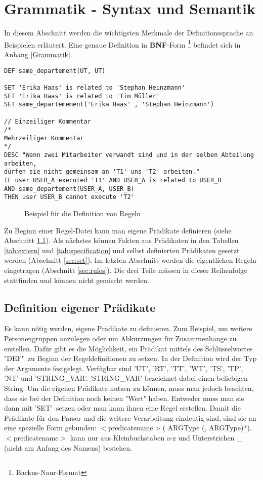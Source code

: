 \section{Grammatik - Syntax und Semantik}
In diesem Abschnitt werden die wichtigsten Merkmale der Definitionssprache an Beispielen erläutert. Eine genaue Definition in \textbf{BNF}-Form \footnote{Backus-Naur-Format} befindet sich in Anhang \ref{Grammatik}.
\begin{verbatim}
DEF same_departement(UT, UT)

SET 'Erika Haas' is related to 'Stephan Heinzmann'
SET 'Erika Haas' is related to 'Tim Müller'
SET same_departemement('Erika Haas' , 'Stephan Heinzmann')

// Einzeiliger Kommentar
/*
Mehrzeiliger Kommentar
*/
DESC "Wenn zwei Mitarbeiter verwandt sind und in der selben Abteilung arbeiten,
dürfen sie nicht gemeinsam an 'T1' uns 'T2' arbeiten."
IF user USER_A executed 'T1' AND USER_A is related to USER_B 
AND same_departement(USER_A, USER_B)
THEN user USER_B cannot execute 'T2'
\end{verbatim}
\begin{figure}[!h]
\caption{Beispiel für die Definition von Regeln}
\label{fig:absolute}
\end{figure}

Zu Beginn einer Regel-Datei kann man eigene Prädikate definieren (siehe Abschnitt \ref{sec:define}). Als nächstes können Fakten aus Prädikaten in den Tabellen \ref{tab:extern} und \ref{tab:specification} und selbst definierten Prädikaten gesetzt werden (Abschnitt \ref{sec:set}). Im letzten Abschnitt werden die eigentlichen Regeln eingetragen (Abschnitt \ref{sec:rules}). Die drei Teile müssen in 
dieser Reihenfolge stattfinden und können nicht gemischt werden. 

%
%

\subsection{Definition eigener Prädikate}
\label{sec:define}
Es kann nötig werden, eigene Prädikate zu definieren. Zum Beispiel, um weitere Personengruppen anzulegen oder um Abkürzungen für Zusammenhänge zu erstellen. Dafür gibt es die Möglichkeit, ein Prädikat mittels des Schlüsselwortes "DEF"\ zu Beginn der Regeldefinitionen zu setzen. In der Definition wird der Typ der Argumente festgelegt. Verfügbar sind 'UT', 'RT', 'TT', 'WT', 'TS', 'TP', 'NT' und 'STRING\_VAR'. 'STRING\_VAR' bezeichnet dabei einen beliebigen String.
Um die eigenen Prädikate nutzen zu können, muss man jedoch beachten, dass sie bei der Definition noch keinen "Wert" haben. Entweder muss man sie dann mit 'SET'\ setzen oder man kann ihnen eine Regel erstellen. Damit die Prädikate für den Parser und die weitere Verarbeitung eindeutig sind, sind sie an eine spezielle Form gebunden: $<$predicatename$>$( ARGType (, ARGType)*). $<$predicatename$>$ kann nur aus Kleinbuchstaben a-z und Unterstrichen \_ (nicht am Anfang des Namens) bestehen.

